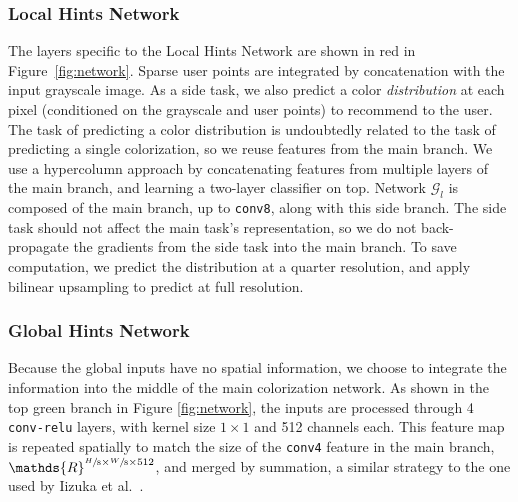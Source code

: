 \documentclass[acmtog,authorversion]{acmart}
\begin{document}
\subsubsection{Local Hints Network} The layers specific to the Local Hints Network are shown in red in Figure~\ref{fig:network}. Sparse user points are integrated by concatenation with the input grayscale image. As a side task, we also predict a color \textit{distribution} at each pixel (conditioned on the grayscale and user points) to recommend to the user. The task of predicting a color distribution is undoubtedly related to the task of predicting a single colorization, so we reuse features from the main branch. We use a hypercolumn approach \cite{hariharan2015hypercolumns,larsson2016learning} by concatenating features from multiple layers of the main branch, and learning a two-layer classifier on top. Network $\mathcal{G}_l$ is composed of the main branch, up to \texttt{conv8}, along with this side branch. The side task should not affect the main task's representation, so we do not back-propagate the gradients from the side task into the main branch. To save computation, we predict the distribution at a quarter resolution, and apply bilinear upsampling to predict at full resolution.

\subsubsection{Global Hints Network} Because the global inputs have no spatial information, we choose to integrate the information into the middle of the main colorization network. As shown in the top green branch in Figure \ref{fig:network}, the inputs are processed through 4 \texttt{conv-relu} layers, with kernel size $1\times 1$ and 512 channels each. This feature map is repeated spatially to match the size of the \texttt{conv4} feature in the main branch, $\mathds{R}^{\sfrac{H}{8}\times \sfrac{W}{8}\times 512}$, and merged by summation, a similar strategy to the one used by Iizuka et al.~.
\end{document}
